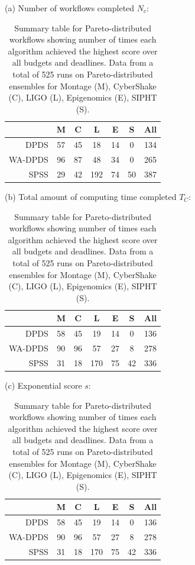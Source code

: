 \documentclass{sig-alternate}
\begin{document}





\begin{table}[tb]
\centering

(a) Number of workflows completed $N_c$:
\medskip
\begin{tabular}{r|cccccc}
 & M & C & L & E & S & All\tabularnewline
\hline
DPDS      &   57  & 45 &  18 &  14  &  0 & 134\tabularnewline
WA-DPDS   &    96 &  87  & 48  & 34  &  0 & 265\tabularnewline
SPSS     &    29  & 42  & 192  & 74  & 50 & 387\tabularnewline
\end{tabular}
\medskip

(b) Total amount of computing time completed $T_C$:
\medskip
\begin{tabular}{r|cccccc}
 & M & C & L & E & S & All\tabularnewline
\hline
DPDS      &   58  & 45 &  19 &  14  &  0 & 136\tabularnewline
WA-DPDS   &    90  & 96  & 57  & 27 &   8 & 278\tabularnewline
SPSS     &    31 &  18 &  170  & 75 &  42 & 336\tabularnewline
\end{tabular}
\medskip

(c) Exponential score $s$:
\medskip
\begin{tabular}{r|cccccc}
 & M & C & L & E & S & All\tabularnewline
\hline
DPDS      &   58  & 45 &  19 &  14  &  0 & 136\tabularnewline
WA-DPDS   &    90  & 96  & 57  & 27 &   8 & 278\tabularnewline
SPSS     &    31 &  18 &  170  & 75 &  42 & 336\tabularnewline
\end{tabular}
\medskip


\caption{Summary table for Pareto-distributed workflows showing number of times
each algorithm achieved the highest score over all budgets and deadlines. Data from a total of 525 runs on 
Pareto-distributed ensembles for Montage (M), CyberShake (C), LIGO (L), 
Epigenomics (E), SIPHT (S).
\label{tab:num-dags-pareto}}
\end{table}
\end{document}
